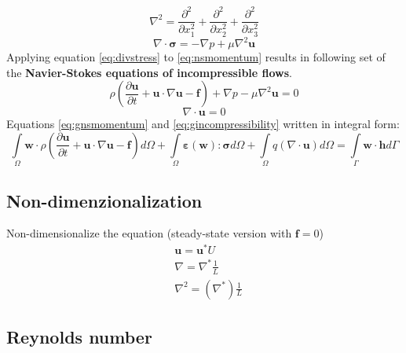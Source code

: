 \documentclass[a4paper,10pt]{book}
\begin{document}
    \begin{equation}
    \nabla^2=\frac{\partial^2}{\partial{x_1^2}}
            +\frac{\partial^2}{\partial{x_2^2}}
            +\frac{\partial^2}{\partial{x_3^2}}
    \end{equation}
    \begin{equation}
    \label{eq:divstress}
    \nabla\cdot\boldsymbol\sigma=-\nabla p+\mu\nabla^2\mathbf{u}
    \end{equation}
    Applying equation \ref{eq:divstress} to \ref{eq:nsmomentum} results in following set of the \textbf{Navier-Stokes equations of incompressible flows}.
    \begin{equation}
    \label{eq:gnsmomentum}
    \rho\left(\frac{\partial\mathbf{u}}{\partial{t}}
    +\mathbf{u}\cdot\nabla\mathbf{u}-\mathbf{f}\right)
    +\nabla p-\mu\nabla^2\mathbf{u}=0
    \end{equation}
    \begin{equation}
    \label{eq:gincompressibility}
    \nabla\cdot\mathbf{u}=0
    \end{equation}
    Equations \ref{eq:gnsmomentum} and \ref{eq:gincompressibility} written in integral form:
    \begin{equation}
    \int\limits_\Omega\mathbf{w}\cdot\rho
    \left(
        \frac{\partial\mathbf{u}}{\partial{t}}+\mathbf{u}\cdot\nabla\mathbf{u}-\mathbf{f}
    \right)d\Omega
    +\int\limits_\Omega\boldsymbol\varepsilon\left(\mathbf{w}\right):\boldsymbol\sigma{d}\Omega
    +\int\limits_\Omega{q}\left(\nabla\cdot\mathbf{u}\right)d\Omega
    =\int\limits_\Gamma\mathbf{w}\cdot\mathbf{h}d\Gamma
    \end{equation}

\subsection{Non-dimenzionalization}

    Non-dimensionalize the equation (steady-state version with $\mathbf{f}=0$)
    \begin{eqnarray}
    &\mathbf{u}=\mathbf{u}^*U \\
    &\nabla=\nabla^*\frac{1}{L} \\
    &\nabla^2=\left(\nabla^*\right)\frac{1}{L}
    \end{eqnarray}

\subsection{Reynolds number}
\end{document}

